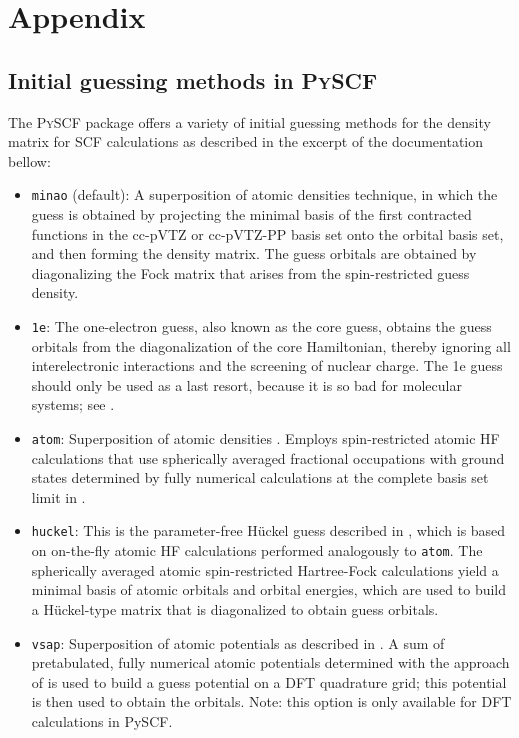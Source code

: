 \appendix
\chapter{Appendix}
\label{sec:appendix}

\section{Initial guessing methods in \textsc{PySCF} \parencite{ref:pyscf}}
\label{sec:pyscf_initial_guessing_methods}
The \textsc{PySCF} package offers a variety of initial guessing methods for the density matrix for SCF calculations as described in the excerpt of the documentation \parencite{ref:pyscf_user_guide} bellow: 
\begin{itemize}
    \item \texttt{minao} (default): A superposition of atomic densities \parencite{ref:minao_sad1,ref:minao_sad2} technique, in which the guess is obtained by projecting the minimal basis of the first contracted functions in the cc-pVTZ or cc-pVTZ-PP basis set onto the orbital basis set, and then forming the density matrix. The guess orbitals are obtained by diagonalizing the Fock matrix that arises from the spin-restricted guess density.

    \item \texttt{1e}: The one-electron guess, also known as the core guess, obtains the guess orbitals from the diagonalization of the core Hamiltonian, thereby ignoring all interelectronic interactions and the screening of nuclear charge. The 1e guess should only be used as a last resort, because it is so bad for molecular systems; see \parencite{ref:Lehtola2019}.

    \item \texttt{atom}: Superposition of atomic densities \parencite{ref:minao_sad1,ref:minao_sad2}. Employs spin-restricted atomic HF calculations that use spherically averaged fractional occupations with ground states determined by fully numerical calculations at the complete basis set limit in \parencite{ref:lethola_fully_numerical_atomic_potentials}.

    \item \texttt{huckel}: This is the parameter-free Hückel guess described in \parencite{ref:Lehtola2019}, which is based on on-the-fly atomic HF calculations performed analogously to \texttt{atom}. The spherically averaged atomic spin-restricted Hartree-Fock calculations yield a minimal basis of atomic orbitals and orbital energies, which are used to build a Hückel-type matrix that is diagonalized to obtain guess orbitals.

    \item \texttt{vsap}: Superposition of atomic potentials as described in \parencite{ref:Lehtola2019}. A sum of pretabulated, fully numerical atomic potentials determined with the approach of \parencite{ref:lethola_fully_numerical_atomic_potentials} is used to build a guess potential on a DFT quadrature grid; this potential is then used to obtain the orbitals. Note: this option is only available for DFT calculations in PySCF.
\end{itemize}
